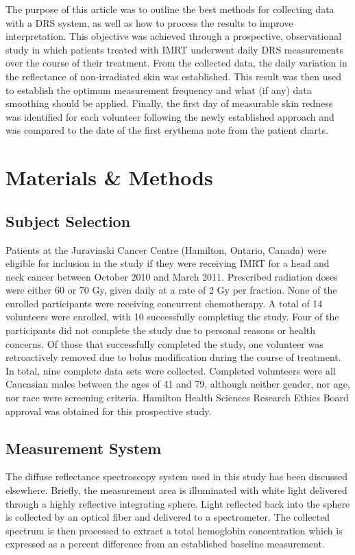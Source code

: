The purpose of this article was to outline the best methods for collecting data with a DRS system, as well as how to process the results to improve interpretation. This objective was achieved through a prospective, observational study in which patients treated with IMRT underwent daily DRS measurements over the course of their treatment. From the collected data, the daily variation in the reflectance of non-irradiated skin was established. This result was then used to establish the optimum measurement frequency and what (if any) data smoothing should be applied. Finally, the first day of measurable skin redness was identified for each volunteer following the newly established approach and was compared to the date of the first erythema note from the patient charts.

\section{Materials \& Methods}

\subsection{Subject Selection}
Patients at the Juravinski Cancer Centre (Hamilton, Ontario, Canada) were eligible for inclusion in the study if they were receiving IMRT for a head and neck cancer between October 2010 and March 2011. Prescribed radiation doses were either 60 or 70 Gy, given daily at a rate of 2 Gy per fraction. None of the enrolled participants were receiving concurrent chemotherapy. A total of 14 volunteers were enrolled, with 10 successfully completing the study. Four of the participants did not complete the study due to personal reasons or health concerns. Of those that successfully completed the study, one volunteer was retroactively removed due to bolus modification during the course of treatment. In total, nine complete data sets were collected. Completed volunteers were all Caucasian males between the ages of 41 and 79, although neither gender, nor age, nor race were screening criteria. Hamilton Health Sciences Research Ethics Board approval was obtained for this prospective study.

\subsection{Measurement System}
The diffuse reflectance spectroscopy system used in this study has been discussed elsewhere.\cite{Glennie2014a} Briefly, the measurement area is illuminated with white light delivered through a highly reflective integrating sphere. Light reflected back into the sphere is collected by an optical fiber and delivered to a spectrometer. The collected spectrum is then processed to extract a total hemoglobin concentration\cite{Glennie2014b} which is expressed as a percent difference from an established baseline measurement.

